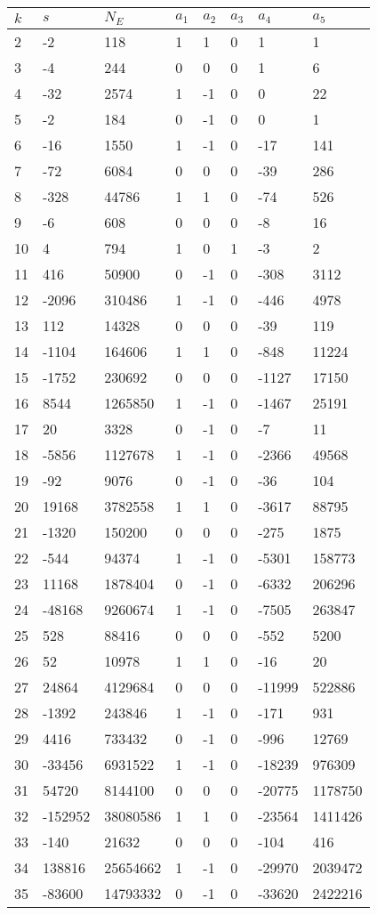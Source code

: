 \documentclass{amsart}
\begin{document}
\begin{longtable}{|l|l|l|lllll|}
\hline
$k$ & $s$ & $N_E$ & $a_1$ & $a_2$ & $a_3$ & $a_4$ & $a_5$\\
\hline
2&-2&118&1&1&0&1&1\\
3&-4&244&0&0&0&1&6\\
4&-32&2574&1&-1&0&0&22\\
5&-2&184&0&-1&0&0&1\\
6&-16&1550&1&-1&0&-17&141\\
7&-72&6084&0&0&0&-39&286\\
8&-328&44786&1&1&0&-74&526\\
9&-6&608&0&0&0&-8&16\\
10&4&794&1&0&1&-3&2\\
11&416&50900&0&-1&0&-308&3112\\
12&-2096&310486&1&-1&0&-446&4978\\
13&112&14328&0&0&0&-39&119\\
14&-1104&164606&1&1&0&-848&11224\\
15&-1752&230692&0&0&0&-1127&17150\\
16&8544&1265850&1&-1&0&-1467&25191\\
17&20&3328&0&-1&0&-7&11\\
18&-5856&1127678&1&-1&0&-2366&49568\\
19&-92&9076&0&-1&0&-36&104\\
20&19168&3782558&1&1&0&-3617&88795\\
21&-1320&150200&0&0&0&-275&1875\\
22&-544&94374&1&-1&0&-5301&158773\\
23&11168&1878404&0&-1&0&-6332&206296\\
24&-48168&9260674&1&-1&0&-7505&263847\\
25&528&88416&0&0&0&-552&5200\\
26&52&10978&1&1&0&-16&20\\
27&24864&4129684&0&0&0&-11999&522886\\
28&-1392&243846&1&-1&0&-171&931\\
29&4416&733432&0&-1&0&-996&12769\\
30&-33456&6931522&1&-1&0&-18239&976309\\
31&54720&8144100&0&0&0&-20775&1178750\\
32&-152952&38080586&1&1&0&-23564&1411426\\
33&-140&21632&0&0&0&-104&416\\
34&138816&25654662&1&-1&0&-29970&2039472\\
35&-83600&14793332&0&-1&0&-33620&2422216\\

\end{longtable}
\end{document}
